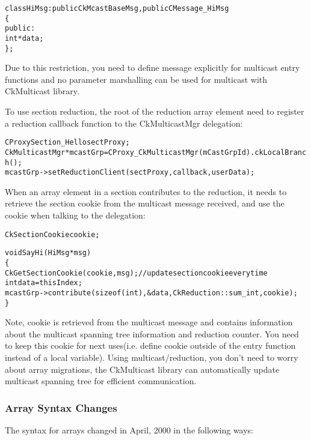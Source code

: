 \begin{alltt}
class HiMsg : public CkMcastBaseMsg, public CMessage_HiMsg
\{
public:
  int *data;
\};
\end{alltt}

Due to this restriction, you need to define message explicitly for multicast 
entry functions and no parameter marshalling can be used for multicast with 
CkMulticast library.

To use section reduction, the root of the reduction array element need to 
 register a reduction callback function to the CkMulticastMgr delegation:

\begin{alltt}
  CProxySection_Hello sectProxy;
  CkMulticastMgr *mcastGrp = CProxy_CkMulticastMgr(mCastGrpId).ckLocalBranch();
  mcastGrp->setReductionClient(sectProxy, callback, userData);
\end{alltt}

When an array element in a section contributes to the reduction, it needs to 
retrieve the section cookie from the multicast message received, and use the 
cookie when talking to the delegation:

\begin{alltt}
  CkSectionCookie cookie;

  void SayHi(HiMsg *msg)
  \{
    CkGetSectionCookie(cookie, msg);     // update section cookie every time
    int data = thisIndex;
    mcastGrp->contribute(sizeof(int), &data, CkReduction::sum_int, cookie);
  \}
\end{alltt}

Note, cookie is retrieved from the multicast message and contains information
about the multicast spanning tree information and reduction counter.
You need to keep this cookie for next uses(i.e. define cookie outside of the 
entry function instead of a local variable). Using multicast/reduction, you
don't need to worry about array migrations, the CkMulticast library can 
automatically update multicast spanning tree for efficient communication.

\subsubsection{Array Syntax Changes}

The syntax for arrays changed in April, 2000 in the following ways:

